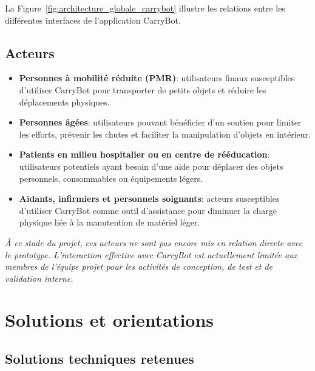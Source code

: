 \documentclass[12pt,a4paper]{article}
\begin{document}
La Figure~\ref{fig:architecture_globale_carrybot} illustre
les relations entre les différentes interfaces de l'application CarryBot.

\subsection{Acteurs}

\begin{itemize}
    \item \textbf{Personnes à mobilité réduite (PMR)}: utilisateurs finaux susceptibles d’utiliser CarryBot pour transporter de petits objets et réduire les déplacements physiques.

    \item \textbf{Personnes âgées}: utilisateurs pouvant bénéficier d’un soutien pour limiter les efforts, prévenir les chutes et faciliter la manipulation d’objets en intérieur.

    \item \textbf{Patients en milieu hospitalier ou en centre de rééducation}: utilisateurs potentiels ayant besoin d’une aide pour déplacer des objets personnels, consommables ou équipements légers.

    \item \textbf{Aidants, infirmiers et personnels soignants}: acteurs susceptibles d’utiliser CarryBot comme outil d’assistance pour diminuer la charge physique liée à la manutention de matériel léger.

\end{itemize}
\vspace{0.5cm}

\noindent
\textit{À ce stade du projet, ces acteurs ne sont pas encore mis en relation directe avec le prototype.  
L’interaction effective avec CarryBot est actuellement limitée aux membres de l’équipe projet pour les activités de conception, de test et de validation interne.}


\section{Solutions et orientations}

\subsection{Solutions techniques retenues}
\end{document}
